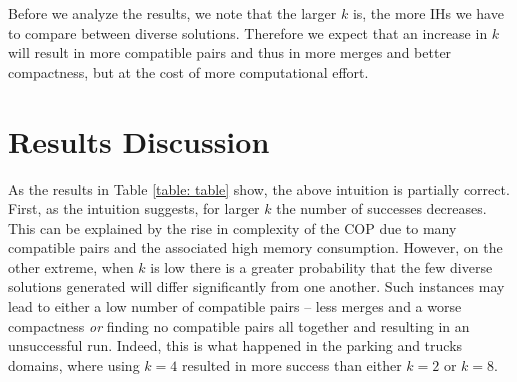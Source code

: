 









Before we analyze the results, we note that the larger $k$ is, the more IHs we have to compare between diverse solutions.
Therefore we expect that an increase in $k$ will result in more compatible pairs and thus in more merges and better compactness, but at the cost of more computational effort. 

\section{Results Discussion}
As the results in Table \ref{table: table} show, the above intuition is partially correct. 
First, as the intuition suggests, for larger $k$ the number of successes decreases. This can be explained by the rise in complexity of the COP due to many compatible pairs and the associated high memory consumption.
However, on the other extreme, when $k$ is low there is a greater probability that the few diverse solutions generated will differ significantly from one another. Such instances may lead to either a low number of compatible pairs -- less merges and a worse compactness {\em or} finding no compatible pairs all together and resulting in an unsuccessful run. Indeed, this is what happened in the parking and trucks domains, where using $k=4$ resulted in more success than either $k=2$ or $k=8$.


